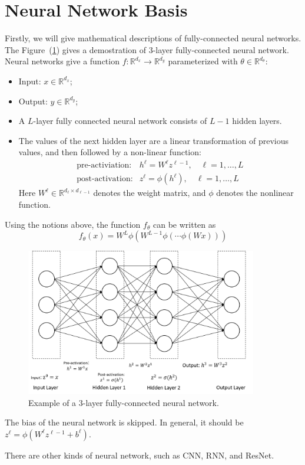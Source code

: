 \section{Neural Network Basis}\label{sec:1:3}
Firstly, we will give mathematical descriptions of fully-connected neural networks. The Figure~(\ref{fig:1:2}) gives a demostration of $3$-layer fully-connected neural network. Neural networks give a function $f:\mathbb{R}^{d_x}\to\mathbb{R}^{d_y}$ parameterized with $\theta\in\mathbb{R}^{d_\theta}$:
\begin{itemize}
\item
Input: $x\in \mathbb{R}^{d_x}$;
\item
Output: $y\in \mathbb{R}^{d_y}$;
\item
A $L$-layer fully connected neural network consists of $L-1$ hidden layers.
\item
The values of the next hidden layer are a linear transformation of previous values, and then followed by a non-linear function:
\[
\begin{array}{ll}
\mbox{pre-activiation}:&h^{\ell}=W^{\ell}z^{\ell-1},\quad\ell=1,\dots,L\\
\mbox{post-activation}:&z^{\ell}=\phi(h^{\ell}),\quad\ell=1,\dots,L
\end{array}
\]
Here $W^{\ell}\in\mathbb{R}^{d_{\ell}\times d_{\ell-1}}$ denotes the weight matrix, and $\phi$ denotes the nonlinear function.
\end{itemize}
Using the notions above, the function $f_\theta$ can be written as
\begin{equation}
f_{\theta}(x) = W^{L}\phi(W^{L-1}\phi(\cdots\phi(Wx)))
\end{equation}
\begin{figure}
\centering
\includegraphics[width=0.9\textwidth]{First_lecture/p_2}
\caption{Example of a $3$-layer fully-connected neural network.}
\label{fig:1:2}
\end{figure}
\begin{remark}
The bias of the neural network is skipped. In general, it should be $z^{\ell}=\phi(W^{\ell}z^{\ell-1}+b^{\ell})$.
\end{remark}
\begin{remark}
There are other kinds of neural network, such as CNN, RNN, and ResNet.
\end{remark}
